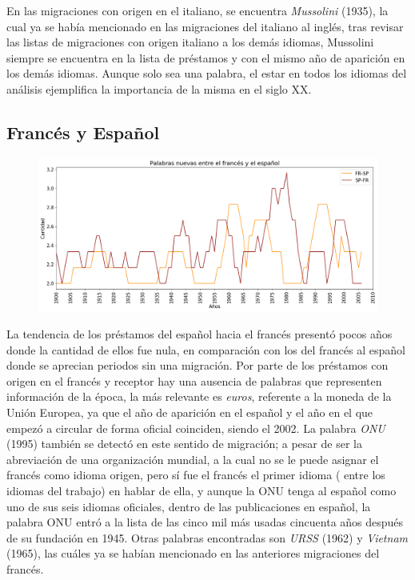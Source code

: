 En las migraciones con origen en el italiano, se encuentra \textit{Mussolini} (1935), la cual ya se había mencionado en las migraciones del italiano al inglés, tras revisar las listas de migraciones con origen italiano  a los demás idiomas, Mussolini siempre se encuentra en la lista de préstamos y con el mismo año de aparición en los demás idiomas.  Aunque solo sea una palabra, el estar en todos los idiomas del análisis ejemplifica la importancia de la misma en el siglo XX. 

\newpage
\subsection{Francés y Español}

\begin{figure}[h!]
	\centering
	\includegraphics[scale=.38]{Cap_2/NC_4_S2_FR.png}
	\label{NC_FS}
	\caption{}
\end{figure}

La tendencia de los préstamos del español hacia el francés presentó pocos años donde la cantidad de ellos fue nula, en comparación con los del francés al español donde se aprecian periodos sin una migración.  Por parte de los préstamos con origen en el francés y receptor hay una ausencia de palabras que representen información de la época, la más relevante es \textit{euros}, referente a la moneda de la Unión Europea, ya que el año de aparición en el español y el año en el que empezó a circular de forma oficial coinciden, siendo el 2002.  La palabra \textit{ONU} (1995)  también se detectó en este sentido de migración; a pesar de ser la abreviación de  una organización mundial,  a la cual no se le puede asignar el francés como idioma origen, pero sí fue el francés el primer idioma ( entre los idiomas del trabajo)  en hablar de ella, y aunque la ONU tenga al español como uno de sus seis idiomas oficiales,  dentro de las publicaciones en español, la palabra ONU entró a la lista de las cinco mil más usadas  cincuenta años después de su fundación en 1945. Otras palabras encontradas son \textit{URSS} (1962) y  \textit{Vietnam} (1965),  las cuáles ya se habían mencionado en las anteriores migraciones del francés. 


